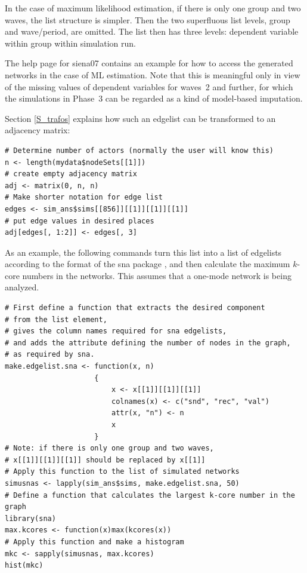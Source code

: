 \documentclass[a4paper,fleqn,11pt]{article}
\newcommand{\+}{\, + \,}
\begin{document}
In the case of maximum likelihood estimation,
if there is only one group and two waves, the list structure is simpler.
Then the two superfluous list levels, group and wave/period, are omitted.
The list then has three levels: dependent variable within group
within simulation run.
\bigskip

The help page for \textsf{siena07} contains an example for how to access the
generated networks in the case of ML estimation. Note that this is meaningful only in view
of the missing values of dependent variables for waves~2 and further, for which the
simulations in Phase~3 can be regarded as a kind of model-based imputation.

Section \ref{S_trafos} explains how such an edgelist can be
transformed to an adjacency matrix:
\begin{verbatim}
# Determine number of actors (normally the user will know this)
n <- length(mydata$nodeSets[[1]])
# create empty adjacency matrix
adj <- matrix(0, n, n)
# Make shorter notation for edge list
edges <- sim_ans$sims[[856]][[1]][[1]][[1]]
# put edge values in desired places
adj[edges[, 1:2]] <- edges[, 3]
\end{verbatim}

As an example, the following commands turn this list into
a list of edgelists according to the format of the \textsf{sna} package
\citep{Butts08}, and then calculate the maximum $k$-core numbers
in the networks.
This assumes that a one-mode network is being analyzed.
\begin{verbatim}
# First define a function that extracts the desired component
# from the list element,
# gives the column names required for sna edgelists,
# and adds the attribute defining the number of nodes in the graph,
# as required by sna.
make.edgelist.sna <- function(x, n)
                     {
                         x <- x[[1]][[1]][[1]]
                         colnames(x) <- c("snd", "rec", "val")
                         attr(x, "n") <- n
                         x
                     }
# Note: if there is only one group and two waves,
# x[[1]][[1]][[1]] should be replaced by x[[1]]
# Apply this function to the list of simulated networks
simusnas <- lapply(sim_ans$sims, make.edgelist.sna, 50)
# Define a function that calculates the largest k-core number in the graph
library(sna)
max.kcores <- function(x)max(kcores(x))
# Apply this function and make a histogram
mkc <- sapply(simusnas, max.kcores)
hist(mkc)
\end{verbatim}
\bigskip
\end{document}
